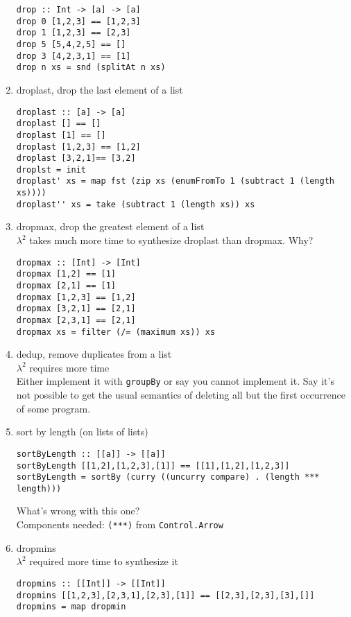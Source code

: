 \begin{enumerate}
	\begin{lstlisting}
drop :: Int -> [a] -> [a]
drop 0 [1,2,3] == [1,2,3]
drop 1 [1,2,3] == [2,3]
drop 5 [5,4,2,5] == []
drop 3 [4,2,3,1] == [1]
drop n xs = snd (splitAt n xs)
	\end{lstlisting}
%
	\item droplast, drop the last element of a list
	\begin{lstlisting}
droplast :: [a] -> [a]
droplast [] == []
droplast [1] == []
droplast [1,2,3] == [1,2]
droplast [3,2,1]== [3,2]
droplst = init
droplast' xs = map fst (zip xs (enumFromTo 1 (subtract 1 (length xs))))
droplast'' xs = take (subtract 1 (length xs)) xs
	\end{lstlisting}
%
	\item dropmax, drop the greatest element of a list\\
	$\lambda^2$ takes much more time to synthesize droplast than dropmax. Why?
	\begin{lstlisting}
dropmax :: [Int] -> [Int]
dropmax [1,2] == [1]
dropmax [2,1] == [1]
dropmax [1,2,3] == [1,2]
dropmax [3,2,1] == [2,1]
dropmax [2,3,1] == [2,1]
dropmax xs = filter (/= (maximum xs)) xs
	\end{lstlisting}
%
	\item dedup, remove duplicates from a list \\
	$\lambda^2$ requires more time\\
	 Either implement it with \lstinline?groupBy? or say you cannot implement it. Say it's not possible to get the usual semantics of deleting all but the first occurrence of some program.
%
	\item sort by length (on lists of lists)
	\begin{lstlisting}
sortByLength :: [[a]] -> [[a]]
sortByLength [[1,2],[1,2,3],[1]] == [[1],[1,2],[1,2,3]]
sortByLength = sortBy (curry ((uncurry compare) . (length *** length)))
	\end{lstlisting}
	 What's wrong with this one? \\
	Components needed: \lstinline?(***)? from \lstinline?Control.Arrow?
%
	\item dropmins \\
	$\lambda^2$ required more time to synthesize it
	\begin{lstlisting}
dropmins :: [[Int]] -> [[Int]]
dropmins [[1,2,3],[2,3,1],[2,3],[1]] == [[2,3],[2,3],[3],[]]
dropmins = map dropmin
	\end{lstlisting}

\end{enumerate}
